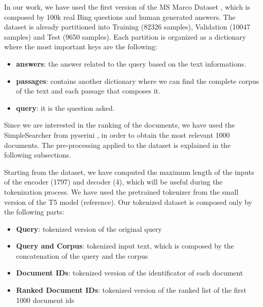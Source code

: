 In our work, we have used the first version of the MS Marco Dataset \cite{bajaj2018msmarcohumangenerated}, which is composed by 100k real Bing questions and human generated answers. The dataset is already partitioned into Training (82326 samples), Validation (10047 samples) and Test (9650 samples). Each partition is organized as a dictionary where the most important keys are the following:
\begin{itemize}
    \item \textbf{answers}: the answer related to the query based on the text informations.
    \item \textbf{passages}: contains another dictionary where we can find the complete corpus of the text and each passage that composes it.
    \item \textbf{query}: it is the question asked.
\end{itemize}
Since we are interested in the ranking of the documents, we have used the SimpleSearcher from pyserini \cite{pyserini}, in order to obtain the most relevant 1000 documents. 
The pre-processing applied to the dataset is explained in the following subsections.

Starting from the dataset, we have computed the maximum length of the inputs of the encoder (1797) and decoder (4), which will be useful during the tokenization process. We have used the pretrained tokenizer from the small version of the T5 model (reference). Our tokenized dataset is composed only by the following parts:
\begin{itemize}
    \item \textbf{Query}: tokenized version of the original query
    \item \textbf{Query and Corpus}: tokenized input text, which is composed by the concatenation of the query and the corpus
    \item \textbf{Document IDs}: tokenized version of the identificator of each document
    \item \textbf{Ranked Document IDs}: tokenized version of the ranked list of the first 1000 document ids
\end{itemize}
